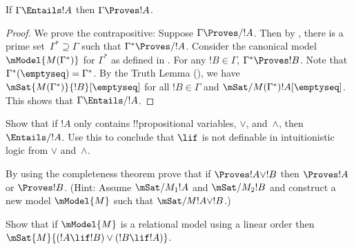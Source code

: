 \documentclass[../../../include/open-logic-section]{subfiles}
\begin{document}

\begin{thm}
  If $\Gamma \Entails !A$ then $\Gamma \Proves !A$.
\end{thm}

\begin{proof}
  We prove the contrapositive: Suppose $\Gamma \Proves/ !A$. Then by
  , there is a prime set~$\Gamma^*
  \supseteq \Gamma$ such that $\Gamma^* \Proves/ !A$. Consider the
  canonical model~$\mModel{M(\Gamma^*)}$ for $\Gamma^*$ as defined in
  . For any $!B \in \Gamma$, $\Gamma^*
  \Proves !B$. Note that $\Gamma^*(\emptyseq) = \Gamma^*$. By the Truth
  Lemma (), we have
  $\mSat{M(\Gamma^*)}{!B}[\emptyseq]$ for all $!B \in \Gamma$ and
  $\mSat/{M(\Gamma^*)}{!A}[\emptyseq]$. This shows that $\Gamma
  \Entails/ !A$.
\end{proof}

\begin{prob}
  Show that if $!A$ only contains !!{propositional variable}s, $\lor$,
  and~$\land$, then $\Entails/ !A$. Use this to conclude that $\lif$ is
  not definable in intuitionistic logic from $\lor$ and~$\land$. 
\end{prob}
  
\begin{prob}
  By using the completeness theorem prove that if $\Proves !A \lor !B$ then
  $\Proves !A$ or $\Proves !B$. (Hint: Assume $\mSat/{M_1}{!A}$ and
  $\mSat/{M_2}{!B}$ and construct a new model $\mModel{M}$ such that
  $\mSat/{M}{!A \lor !B}$.)
\end{prob}
  
\begin{prob} 
  Show that if $\mModel{M}$ is a relational model using a linear order then
  $\mSat{M}{(!A \lif !B)\lor(!B \lif !A)}$.
\end{prob}
\end{document}
